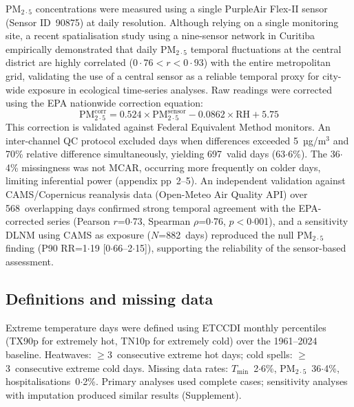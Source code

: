 \documentclass[review,number]{elsarticle}
\begin{document}
$\text{PM}_{2{\cdot}5}$ concentrations were measured using a single PurpleAir
Flex-II sensor (Sensor ID~90875) at daily resolution. Although
relying on a single monitoring site, a recent spatialisation study
using a nine-sensor network in Curitiba empirically demonstrated
that daily $\text{PM}_{2{\cdot}5}$ temporal fluctuations at the central
district are highly correlated ($0{\cdot}76 < r < 0{\cdot}93$) with
the entire metropolitan grid, validating the use of a central sensor
as a reliable temporal proxy for city-wide exposure in ecological
time-series analyses.\cite{daCosta2024} Raw readings were corrected
using the EPA nationwide correction equation:\cite{Barkjohn2021}
%
\begin{equation}
  \mathrm{PM}_{2{\cdot}5}^{\mathrm{corr}} =
    0.524 \times \mathrm{PM}_{2{\cdot}5}^{\mathrm{sensor}}
    - 0.0862 \times \mathrm{RH} + 5.75
  \label{eq:epa}
\end{equation}
%
This correction is validated against Federal Equivalent Method
monitors.\cite{Holder2020,Magi2020,Barkjohn2022} An inter-channel
QC protocol excluded days when differences exceeded 5~µg/m$^3$ and
70\% relative difference simultaneously, yielding 697~valid days
(63${\cdot}$6\%). The 36${\cdot}$4\% missingness was not MCAR,
occurring more frequently on colder days, limiting inferential power
(appendix pp~2--5). An independent validation against
CAMS/Copernicus reanalysis data (Open-Meteo Air Quality API) over
568~overlapping days confirmed strong temporal agreement with the
EPA-corrected series (Pearson $r$=0${\cdot}$73, Spearman
$\rho$=0${\cdot}$76, $p$$<$0${\cdot}$001), and a sensitivity DLNM
using CAMS as exposure ($N$=882~days) reproduced the null
$\text{PM}_{2{\cdot}5}$ finding (P90 RR=1${\cdot}$19
[0${\cdot}$66--2${\cdot}$15]), supporting the reliability of the
sensor-based assessment.

\subsection{Definitions and missing data}

Extreme temperature days were defined using ETCCDI monthly percentiles
(TX90p for extremely hot, TN10p for extremely cold) over the 1961--2024
baseline. Heatwaves: $\geq$3~consecutive extreme hot days; cold spells:
$\geq$3~consecutive extreme cold days. Missing data rates:
$T_\mathrm{min}$~2${\cdot}$6\%, $\text{PM}_{2{\cdot}5}$~36${\cdot}$4\%,
hospitalisations~0${\cdot}$2\%. Primary analyses used complete cases;
sensitivity analyses with imputation produced similar results
(Supplement).
\end{document}
